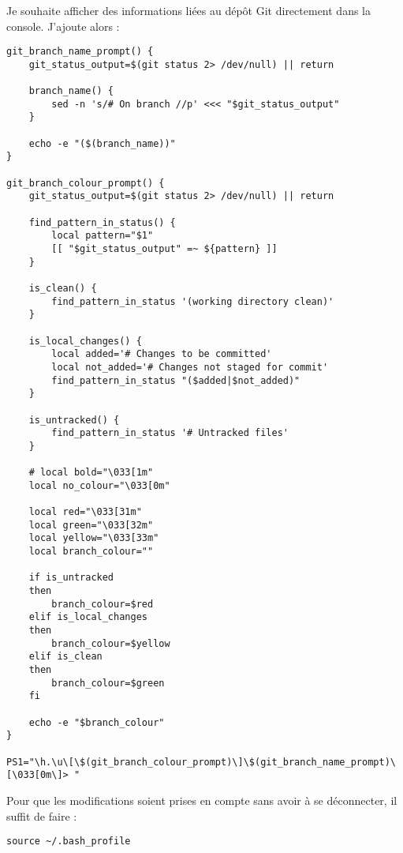 Je souhaite afficher des informations liées au dépôt Git directement dans la console. J'ajoute alors : 
\begin{footnotesize}
\begin{verbatim}
git_branch_name_prompt() {
    git_status_output=$(git status 2> /dev/null) || return

    branch_name() {
        sed -n 's/# On branch //p' <<< "$git_status_output"
    }

    echo -e "($(branch_name))"
}

git_branch_colour_prompt() {
    git_status_output=$(git status 2> /dev/null) || return

    find_pattern_in_status() {
        local pattern="$1"
        [[ "$git_status_output" =~ ${pattern} ]]
    }

    is_clean() {
        find_pattern_in_status '(working directory clean)'
    }

    is_local_changes() {
        local added='# Changes to be committed'
        local not_added='# Changes not staged for commit'
        find_pattern_in_status "($added|$not_added)"
    }

    is_untracked() {
        find_pattern_in_status '# Untracked files'
    }

    # local bold="\033[1m"
    local no_colour="\033[0m"

    local red="\033[31m"
    local green="\033[32m"
    local yellow="\033[33m"
    local branch_colour=""

    if is_untracked
    then
        branch_colour=$red
    elif is_local_changes
    then
        branch_colour=$yellow
    elif is_clean
    then
        branch_colour=$green
    fi

    echo -e "$branch_colour"
}

PS1="\h.\u\[\$(git_branch_colour_prompt)\]\$(git_branch_name_prompt)\[\033[0m\]> "
\end{verbatim}
\end{footnotesize}

Pour que les modifications soient prises en compte sans avoir à se déconnecter, il suffit de faire :
\begin{verbatim}
source ~/.bash_profile
\end{verbatim}

